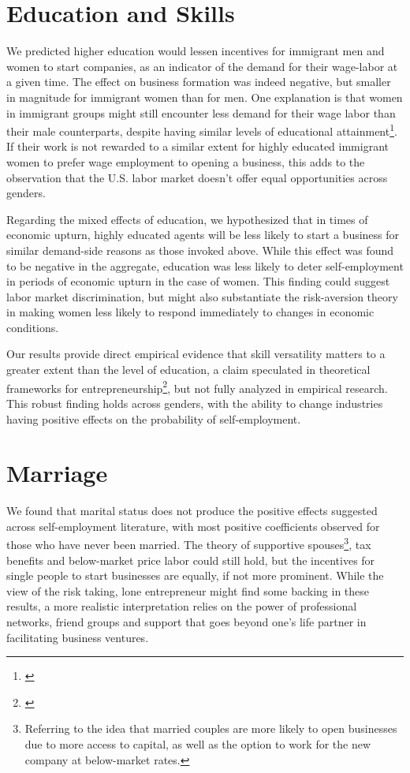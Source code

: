 \section{Education and Skills}
We predicted higher education would lessen incentives for immigrant men and women to start companies, as an indicator of the demand for their wage-labor at a given time. The effect on business formation was indeed negative, but smaller in magnitude for immigrant women than for men. One explanation is that women in immigrant groups might still encounter less demand for their wage labor than their male counterparts, despite having similar levels of educational attainment\footnote{\cite{ReynoldsWhite1997}}. If their work is not rewarded to a similar extent for highly educated immigrant women to prefer wage employment to opening a business, this adds to the observation that the U.S. labor market doesn't offer equal opportunities across genders.

Regarding the mixed effects of education, we hypothesized that in times of economic upturn, highly educated agents will be less likely to start a business for similar demand-side reasons as those invoked above. While this effect was found to be negative in the aggregate, education was less likely to deter self-employment in periods of economic upturn in the case of women. This finding could suggest labor market discrimination, but might also substantiate the risk-aversion theory in making women less likely to respond immediately to changes in economic conditions.

Our results provide direct empirical evidence that skill versatility matters to a greater extent than the level of education, a claim speculated in theoretical frameworks for entrepreneurship\footnote{\cite{Lazear2005}}, but not fully analyzed in empirical research. This robust finding holds across genders, with the ability to change industries having positive effects on the probability of self-employment. 

\section{Marriage}

We found that marital status does not produce the positive effects suggested across self-employment literature, with most positive coefficients observed for those who have never been married. The theory of supportive spouses\footnote{ Referring to the idea that married couples are more likely to open businesses due to more access to capital, as well as the option to work for the new company at below-market rates.}, tax benefits and below-market price labor could still hold, but the incentives for single people to start businesses are equally, if not more prominent. While the view of the risk taking, lone entrepreneur might find some backing in these results, a more realistic interpretation relies on the power of professional networks, friend groups and support that goes beyond one's life partner in facilitating business ventures. 

